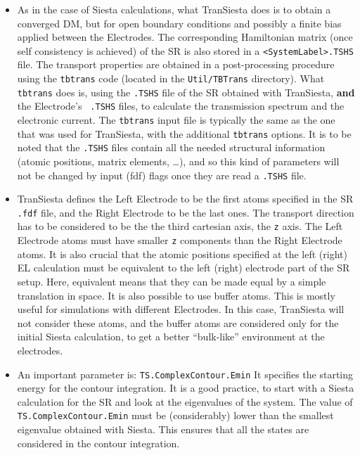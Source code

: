 \documentclass[11pt]{article}
\begin{document}
\begin{itemize}
\item
As in the case of {\sc Siesta} calculations, what {\sc TranSiesta}
does is to obtain a converged DM, but for open boundary conditions and
possibly a finite bias applied between the Electrodes. The
corresponding Hamiltonian matrix (once self consistency is achieved)
of the SR is also stored in a {\tt <SystemLabel>.TSHS} file. The
transport properties are obtained in a post-processing procedure using
the {\tt tbtrans} code (located in the {\tt Util/TBTrans}
directory). What {\tt tbtrans} does is, using the {\tt .TSHS} file of
the SR obtained with {\sc TranSiesta}, {\bf and} the Electrode's {\tt
  .TSHS} files, to calculate the transmission spectrum and the
electronic current. The {\tt tbtrans} input file is typically the same
as the one that was used for {\sc TranSiesta}, with the additional
{\tt tbtrans} options. It is to be noted that the {\tt .TSHS} files
contain all the needed structural information (atomic positions,
matrix elements, \ldots), and so this kind of parameters will not be
changed by input (fdf) flags once they are read a {\tt .TSHS} file.

\item
{\sc TranSiesta} defines the Left Electrode to be the first atoms
specified in the SR {\tt .fdf} file, and the Right Electrode to be the
last ones. The transport direction has to be considered to be the the
third cartesian axis, the {\tt z} axis. The Left Electrode atoms must
have smaller {\tt z} components than the Right Electrode atoms. It is
also crucial that the atomic positions specified at the left (right)
EL calculation must be equivalent to the left (right) electrode part
of the SR setup. Here, equivalent means that they can be made equal by
a simple translation in space. It is also possible to use buffer
atoms. This is mostly useful for simulations with different
Electrodes.  In this case, {\sc TranSiesta} will not consider these
atoms, and the buffer atoms are considered only for the initial {\sc
  Siesta} calculation, to get a better ``bulk-like'' environment at
the electrodes.

\item
An important parameter is: {\tt TS.ComplexContour.Emin} It specifies
the starting energy for the contour integration. It is a good
practice, to start with a {\sc Siesta} calculation for the SR and look
at the eigenvalues of the system. The value of {\tt
  TS.ComplexContour.Emin} must be (considerably) lower than the
smallest eigenvalue obtained with {\sc Siesta}. This ensures that all
the states are considered in the contour integration.


\end{itemize}
\end{document}
